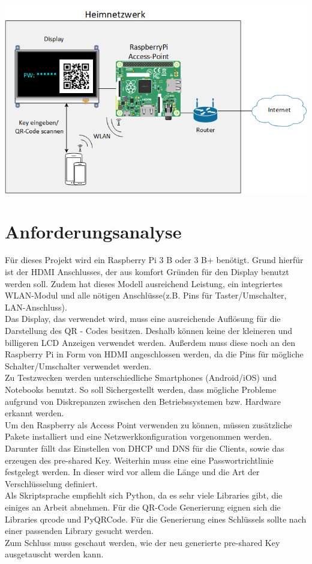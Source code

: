 \documentclass[a4paper,11pt,singlespacing]{article}
\begin{document}
	\includegraphics[scale=0.6]{skizze}
	
	\section{Anforderungsanalyse}

	Für dieses Projekt wird ein Raspberry Pi 3 B oder 3 B+ benötigt. Grund hierfür ist der HDMI Anschlusses, der aus komfort Gründen für den Display benutzt werden soll. Zudem hat dieses Modell ausreichend Leistung, ein integriertes WLAN-Modul und alle nötigen Anschlüsse(z.B. Pins für Taster/Umschalter, LAN-Anschluss). \\
	Das Display, das verwendet wird, muss eine ausreichende Auflösung für die Darstellung des QR - Codes besitzen. Deshalb können keine der kleineren und billigeren LCD Anzeigen verwendet werden. Außerdem muss diese noch an den Raspberry Pi in Form von HDMI angeschlossen werden, da die Pins für mögliche Schalter/Umschalter verwendet werden. \\
	Zu Testzwecken werden unterschiedliche Smartphones (Android/iOS) und Notebooks benutzt. So soll Sichergestellt werden, dass mögliche Probleme aufgrund von Diskrepanzen zwischen den Betriebssystemen bzw. Hardware erkannt werden.\\
	Um den Raspberry als Access Point verwenden zu können, müssen zusätzliche Pakete installiert und eine Netzwerkkonfiguration vorgenommen werden. Darunter fällt das Einstellen von DHCP und DNS für die Clients, sowie das erzeugen des pre-shared Key. Weiterhin muss eine eine Passwortrichtlinie festgelegt werden. In dieser wird vor allem die Länge und die Art der Verschlüsselung definiert.\\
	Als Skriptsprache empfiehlt sich Python, da es sehr viele Libraries gibt, die einiges an Arbeit abnehmen. Für die QR-Code Generierung eignen sich die Libraries qrcode und PyQRCode. Für die Generierung eines Schlüssels sollte nach einer passenden Library gesucht werden.\\
	Zum Schluss muss geschaut werden, wie der neu generierte pre-shared Key ausgetauscht werden kann.\\
	
\end{document}
